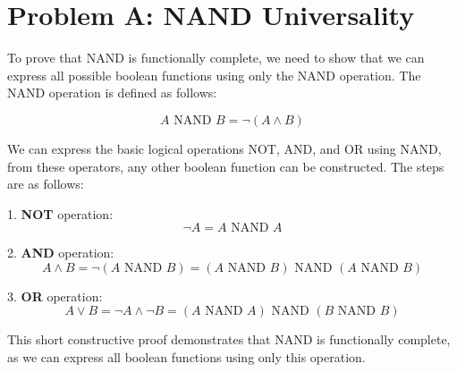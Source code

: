 \documentclass{solutionclass} %
\begin{document}
    \divider

    \section{Problem A: NAND Universality}
    \begin{solution}
        To prove that NAND is functionally complete, we need to show that we can express all possible boolean functions using only the NAND operation. The NAND operation is defined as follows:

        \[
        A \text{ NAND } B = \neg (A \land B)
        \]

        We can express the basic logical operations NOT, AND, and OR using NAND, from these operators, any other boolean function can be constructed. The steps are as follows:

        \vspace{1em}

        1. \textbf{NOT} operation:
        \[
        \neg A = A \text{ NAND } A
        \]

        2. \textbf{AND} operation:
        \[
        A \land B = \neg (A \text{ NAND } B) = (A \text{ NAND } B) \text{ NAND } (A \text{ NAND } B)
        \]

        3. \textbf{OR} operation:
        \[
        A \lor B = \neg A \land \neg B = (A \text{ NAND } A) \text{ NAND } (B \text{ NAND } B)
        \]

        \vspace{1em}

        This short constructive proof demonstrates that NAND is functionally complete, as we can express all boolean functions using only this operation.
    \end{solution}

    \thispagestyle{fancyplain}
    \fancyhead{}
    \renewcommand{\headrulewidth}{0pt}
\end{document}
